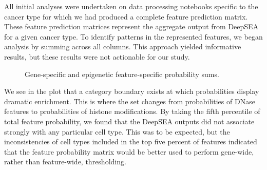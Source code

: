 \documentclass{article}
\begin{document}
All initial analyses were undertaken on data processing notebooks specific to the cancer type for which we had produced a complete feature prediction matrix. These feature prediction matrices represent the aggregate output from DeepSEA for a given cancer type. To identify patterns in the represented features, we began analysis by summing across all columns. This approach yielded informative results, but these results were not actionable for our study. 

\begin{figure}[h!] 
    \centering
    \hfill%
    \caption{Gene-specific and epigenetic feature-specific probability sums.}
\end{figure}
We see in the plot that a category boundary exists at which  probabilities display dramatic enrichment. This is where the set changes from probabilities of DNase features to probabilities of histone modifications. By taking the fifth percentile of total feature probability, we found that the DeepSEA outputs did not associate strongly with any particular cell type. This was to be expected, but the inconsistencies of cell types included in the top five percent of features indicated that the feature probability matrix would be better used to perform gene-wide, rather than feature-wide, thresholding. 
\end{document}
